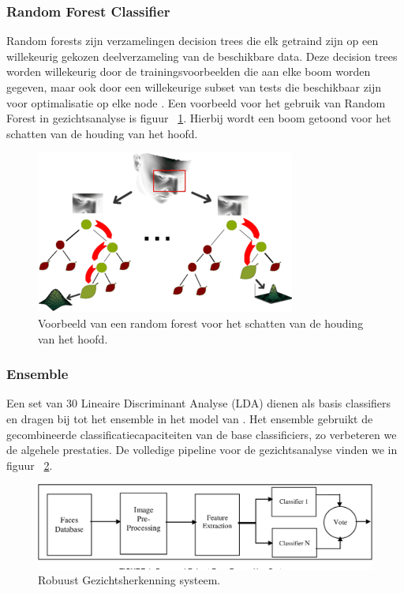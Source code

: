 \subsubsection{Random Forest Classifier}
\label{subsub:vrandomforest}
Random forests zijn verzamelingen decision trees die elk getraind zijn op een willekeurig gekozen deelverzameling van de beschikbare data. Deze decision trees worden willekeurig door de trainingsvoorbeelden die aan elke boom worden gegeven,  maar ook door een willekeurige subset van tests die beschikbaar zijn voor optimalisatie op elke node \autocite{Fanelli2012}. 
Een voorbeeld voor het gebruik van Random Forest in gezichtsanalyse is figuur {~\ref{fig:vrandomforest}}. Hierbij wordt een boom getoond voor het  schatten van de houding van het hoofd. 
\begin{figure}
    \centering
    \includegraphics[width=\columnwidth]{graphics/headposition.png}
    \caption[Random forest voor houding van het hoofd]{\label{fig:vrandomforest}Voorbeeld van een random forest voor het schatten van de houding van het hoofd\autocite{Fanelli2012}.}
\end{figure}

\subsubsection{Ensemble}
\label{subsub:vensemble}
Een set van 30 Lineaire Discriminant Analyse (LDA) dienen als basis classifiers en dragen bij tot het ensemble in het model van \textcite{Khan2017}. Het ensemble gebruikt de gecombineerde classificatiecapaciteiten van de base classificiers, zo verbeteren we de algehele prestaties. De volledige pipeline voor de gezichtsanalyse vinden we in figuur {~\ref{fig:vensemble}}. 
\begin{figure}
    \centering
    \includegraphics[width=\columnwidth]{graphics/ensemble.png}
    \caption[Robuust gezichtsherkenning systeem]{\label{fig:vensemble}Robuust Gezichtsherkenning systeem\autocite{Khan2017}.}
\end{figure}

